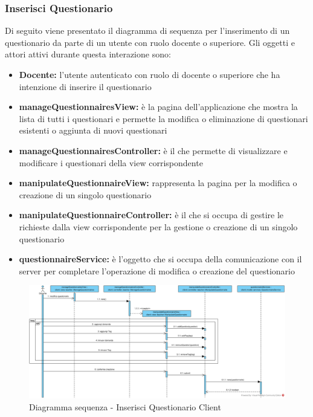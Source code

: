 \documentclass[12pt,a4paper]{article}
\begin{document}
\newpage
\subsubsection{Inserisci Questionario}
Di seguito viene presentato il diagramma di sequenza per l'inserimento di un questionario da parte di un utente con ruolo docente o superiore. Gli oggetti e attori attivi durante questa interazione sono:

\begin{itemize}
	\item \textbf{Docente:}	 l'utente autenticato con ruolo di docente o superiore che ha intenzione di inserire il questionario
	\item \textbf{manageQuestionnairesView:} è la pagina dell'applicazione che mostra la lista di tutti i questionari e permette la modifica o eliminazione di questionari esistenti o aggiunta di nuovi questionari
	\item \textbf{manageQuestionnairesController:} è il  che permette di visualizzare e modificare i questionari della view corrispondente
	\item \textbf{manipulateQuestionnaireView:} rappresenta la pagina per la modifica o creazione di un singolo questionario
	\item \textbf{manipulateQuestionnaireController:} è il  che si occupa di gestire le richieste dalla view corrispondente per la gestione o creazione di un singolo questionario
	\item \textbf{questionnaireService:} è l'oggetto che si occupa della comunicazione con il server per completare l'operazione di modifica o creazione del questionario
\end{itemize}

\begin{center}
	\begin{figure}[H]
		\centering \includegraphics[max width=\myheight, angle=90]{../img/diagrammiSequenza/inserisciQuestionarioClient.png}
		\caption{Diagramma sequenza - Inserisci Questionario Client}
	\end{figure}
\end{center}
\end{document}
